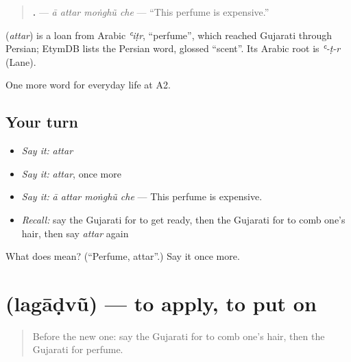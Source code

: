 \begin{quote}
\textbf{   .} — \emph{ā attar moṅghũ che} — \textquotedblleft{}This perfume is expensive.\textquotedblright{}
\end{quote}

\begin{cousinweb}
\textbf{} (\emph{attar}) is a loan from Arabic \emph{ʿiṭr}, \textquotedblleft{}perfume\textquotedblright{}, which reached Gujarati through Persian; EtymDB lists the Persian word, glossed \textquotedblleft{}scent\textquotedblright{}. Its Arabic root is \emph{ʿ-ṭ-r} (Lane).
\end{cousinweb}

\begin{grammarlens}[title={What you've built}]
One more word for everyday life at A2.
\end{grammarlens}

\subsection*{Your turn}
\begin{itemize}
\raggedright
  \item \emph{Say it:} \emph{attar}
  \item \emph{Say it:} \emph{attar}, once more
  \item \emph{Say it:} \emph{ā attar moṅghũ che} — This perfume is expensive.
  \item \emph{Recall:} say the Gujarati for to get ready, then the Gujarati for to comb one's hair, then say \emph{attar} again
\end{itemize}

\begin{tcolorbox}[breakable,colback=teal!4,colframe=teal!35!black,title={Before you move on}]
What does  mean? (\textquotedblleft{}Perfume, attar\textquotedblright{}.) Say it once more.
\end{tcolorbox}
\section[\texorpdfstring{\gu{લગાડવું} (lagāḍvũ)}{લગાડવું (lagāḍvũ)}]{ (lagāḍvũ) — to apply, to put on}

\label{lesson:GU-C155-lagadvu}



\begin{quote}
Before the new one: say the Gujarati for to comb one's hair, then the Gujarati for perfume.
\end{quote}

